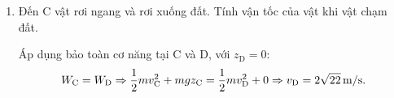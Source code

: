 \begin{enumerate}[label=\bfseries Câu \arabic*:]
{\begin{enumerate}[label=\alph*)]
		Chọn gốc thế năng tại mặt đất (tại D).
		
		Độ cao điểm A là $z_\text{A} = h + R = \SI{4.4}{m}$.
		
		Độ cao điểm C là $z_\text{C} = h = \SI{2}{m}$.
		
		Áp dụng bảo toàn cơ năng tại A và C:
		$$W_\text{A} = W_\text{C} \Rightarrow 0 + mgz_\text A = \dfrac{1}{2}mv_\text{C}^2 + mgz_\text{C} \Rightarrow v_\text{C} = \xsi{4\sqrt 3}{m/s}.$$
		
		\item Đến C vật rơi ngang và rơi xuống đất. Tính vận tốc của vật khi vật chạm đất.
		
		Áp dụng bảo toàn cơ năng tại C và D, với $z_\text{D} = 0$:
		$$W_\text{C} = W_\text{D} \Rightarrow \dfrac{1}{2}mv_\text{C}^2 + mgz_\text{C} = \dfrac{1}{2} mv_\text{D}^2 + 0 \Rightarrow v_\text{D} = \xsi{2\sqrt{22}}{m/s}.$$
	\end{enumerate}
}
	
\end{enumerate}


